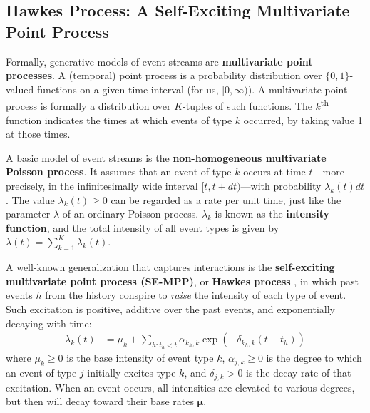 \documentclass{article}
\renewcommand{\vec}[1]{{\boldsymbol{\mathbf{#1}}}}   %
\newcommand{\defn}[1]{\textbf{#1}}   %
\renewcommand{\th}{\textsuperscript{th}\xspace}
\newcommand{\note}[4][]{\todo[author=#2,color=#3,size=\scriptsize,fancyline,caption={},#1]{#4}} %
\newcommand{\jason}[2][]{\note[#1]{jason}{green!40}{#2}}
\begin{document}
\subsection{Hawkes Process: A Self-Exciting Multivariate Point Process}
\label{sec:poisson_process}
\label{sec:hawkes_process}
\label{sec:SE-MPP}
Formally, generative models of event streams are \defn{multivariate point processes}.  A (temporal) point process is a probability distribution over $\{0,1\}$-valued functions on a given time interval (for us, $[0,\infty)$).  A multivariate point process is formally a distribution over $K$-tuples of such functions.  The $k$\th function indicates the times at which events of type $k$ occurred, by taking value 1 at those times.

A basic model of event streams is the \defn{non-homogeneous multivariate Poisson process}.  It assumes that an event of type $k$ occurs at time $t$---more precisely, in the infinitesimally wide interval $[t,t+dt)$---with probability $\lambda_k(t) dt$.  The value $\lambda_k(t) \geq 0$ can be regarded as a rate per unit time, just like the parameter $\lambda$ of an ordinary Poisson process.  $\lambda_k$ is known as the \defn{intensity function}, and the total intensity of all event types is given by $\lambda(t) = \sum_{k=1}^K \lambda_k(t)$.


A well-known generalization that captures interactions is the \defn{self-exciting multivariate point process (SE-MPP)},
or \defn{Hawkes process} \citep{hawkes-71,liniger-09-hawkes}, in which past events $h$ from the history conspire to {\em raise} the intensity of each type of event.
Such excitation is positive, additive over the past events, and exponentially decaying with time:
\begin{align}\label{eqn:hawkes}
    \lambda_k(t)
    &= \mu_k + \sum_{h: t_h < t} \alpha_{k_h,k} \exp (-\delta_{k_h,k} (t-t_h) )
\end{align}
where \mbox{$\mu_{k} \geq 0$} is the base intensity of event type $k$, \mbox{$\alpha_{j,k} \geq 0$} is the degree to which an event of type $j$ initially excites type $k$, and \mbox{$\delta_{j,k} > 0$} is the decay rate of that excitation.
When an event occurs, all intensities are elevated to various degrees, but then will decay toward their base rates $\vec{\mu}$.
\end{document}
